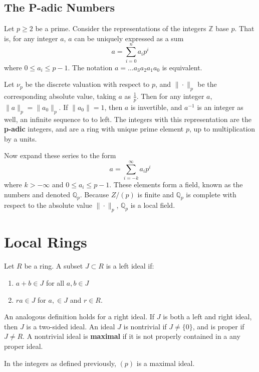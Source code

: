 \documentclass[11pt]{article}
\begin{document}
\subsection*{The P-adic Numbers}
\begin{example*}
Let $p \ge 2$ be a prime.
Consider the representations of the integers $\mathbb{Z}$ base $p$.
That is, for any integer $a$, $a$ can be uniquely expressed as a sum
\[
a = \sum_{i=0}^n a_i p^i
\]
where $0 \le a_i \le p - 1$.
The notation $a = \dotsc a_3 a_2 a_1 a_0$ is equivalent.


Let $\nu_p$ be the discrete valuation with respect to $p$,
and $\|\cdot \|_p$ be the corresponding absolute value, taking $a$ as $\frac{1}{p}$.
Then for any integer $a$, $\|a\|_p = \|a_0\|_p$.
If $\|a_0\| = 1$, then $a$ is invertible, and $a^{-1}$ is an integer as well, an infinite sequence to to left.
The integers with this representation are the \textbf{p-adic} integers, and are a ring with unique prime element $p$, up to multiplication by a units.

Now expand these series to the form
\[
a = \sum_{i = -k}^\infty a_i p^i
\]
where $k > - \infty$ and $0 \le a_i \le p - 1$.
These elements form a field, known as the \padic numbers and denoted $\mathbb{Q}_p$.
Because $Z/(p)$ is finite and $\mathbb{Q}_p$ is complete with respect to the absolute value $\|\cdot \|_p$, $\mathbb{Q}_p$ is a local field.

\end{example*}
\newpage

\section*{Local Rings}
\begin{definition*}
Let $R$ be a ring.
A subset $J \subset R$ is a left ideal if:
\begin{enumerate}
\item $a + b \in J$ for all $a, b \in J$
\item $ra \in J$ for $a, \in J$ and $r \in R$.
\end{enumerate}
An analogous definition holds for a right ideal.
If $J$ is both a left and right ideal, then $J$ is a two-sided ideal.
An ideal $J$ is nontrivial if $J \ne \{0\}$, and is proper if $J \ne R$.
A nontrivial ideal is \textbf{maximal} if it is not properly contained in a any proper ideal.
\end{definition*} 

\begin{example*}
In the \padic integers as defined previously, $(p)$ is a maximal ideal.
\end{example*}
\end{document}
